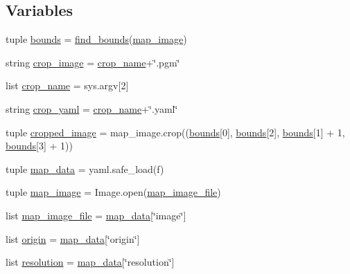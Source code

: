 \subsection*{Variables}
\begin{DoxyCompactItemize}
\item 
tuple \hyperlink{namespacecrop__map_aa587e91d57d18ea9906970aa85ee4bd2}{bounds} = \hyperlink{namespacecrop__map_af40274c22a8c8ec323ede2c6353d653a}{find\-\_\-bounds}(\hyperlink{namespacecrop__map_afd633be1a08796a6cf51525ffe2c798c}{map\-\_\-image})
\item 
string \hyperlink{namespacecrop__map_a07069eafc6d8c8f341771d2ac8bbf616}{crop\-\_\-image} = \hyperlink{namespacecrop__map_addfc4aa986e764d9ad40aa6109771415}{crop\-\_\-name}+\char`\"{}.pgm\char`\"{}
\item 
list \hyperlink{namespacecrop__map_addfc4aa986e764d9ad40aa6109771415}{crop\-\_\-name} = sys.\-argv\mbox{[}2\mbox{]}
\item 
string \hyperlink{namespacecrop__map_a087380cbd829f0b2fad3fe1840a484ef}{crop\-\_\-yaml} = \hyperlink{namespacecrop__map_addfc4aa986e764d9ad40aa6109771415}{crop\-\_\-name}+\char`\"{}.yaml\char`\"{}
\item 
tuple \hyperlink{namespacecrop__map_a2f013a29ad592b823d543b8efc8bc9ae}{cropped\-\_\-image} = map\-\_\-image.\-crop((\hyperlink{namespacecrop__map_aa587e91d57d18ea9906970aa85ee4bd2}{bounds}\mbox{[}0\mbox{]}, \hyperlink{namespacecrop__map_aa587e91d57d18ea9906970aa85ee4bd2}{bounds}\mbox{[}2\mbox{]}, \hyperlink{namespacecrop__map_aa587e91d57d18ea9906970aa85ee4bd2}{bounds}\mbox{[}1\mbox{]} + 1, \hyperlink{namespacecrop__map_aa587e91d57d18ea9906970aa85ee4bd2}{bounds}\mbox{[}3\mbox{]} + 1))
\item 
tuple \hyperlink{namespacecrop__map_af86edf3ccdfff41391f99efc69d2d4da}{map\-\_\-data} = yaml.\-safe\-\_\-load(f)
\item 
tuple \hyperlink{namespacecrop__map_afd633be1a08796a6cf51525ffe2c798c}{map\-\_\-image} = Image.\-open(\hyperlink{namespacecrop__map_af48d47a4bef471975d0ec5c45897b900}{map\-\_\-image\-\_\-file})
\item 
list \hyperlink{namespacecrop__map_af48d47a4bef471975d0ec5c45897b900}{map\-\_\-image\-\_\-file} = \hyperlink{namespacecrop__map_af86edf3ccdfff41391f99efc69d2d4da}{map\-\_\-data}\mbox{[}\char`\"{}image\char`\"{}\mbox{]}
\item 
list \hyperlink{namespacecrop__map_a4cc67daeadf848702b238b211698dd8a}{origin} = \hyperlink{namespacecrop__map_af86edf3ccdfff41391f99efc69d2d4da}{map\-\_\-data}\mbox{[}\char`\"{}origin\char`\"{}\mbox{]}
\item 
list \hyperlink{namespacecrop__map_a43467b8e29a36d66d95b7ee9f9570572}{resolution} = \hyperlink{namespacecrop__map_af86edf3ccdfff41391f99efc69d2d4da}{map\-\_\-data}\mbox{[}\char`\"{}resolution\char`\"{}\mbox{]}
\end{DoxyCompactItemize}



